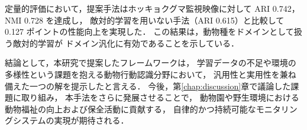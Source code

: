 定量的評価において，提案手法はホッキョクグマ監視映像に対して
ARI 0.742，NMI 0.728 を達成し，
敵対的学習を用いない手法（ARI 0.615）と比較して
0.127 ポイントの性能向上を実現した．
この結果は，動物種をドメインとして扱う敵対的学習が
ドメイン汎化に有効であることを示している．

\vspace{1em}

結論として，本研究で提案したフレームワークは，
学習データの不足や環境の多様性という課題を抱える動物行動認識分野において，
汎用性と実用性を兼ね備えた一つの解を提示したと言える．
今後，第\ref{chap:discussion}章で議論した課題に取り組み，
本手法をさらに発展させることで，
動物園や野生環境における動物福祉の向上および保全活動に貢献する，
自律的かつ持続可能なモニタリングシステムの実現が期待される．